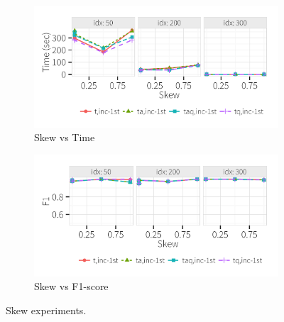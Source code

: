% 
% 
% 
 
  \begin{figure}[h]
    \centering
    \begin{subfigure}[t]{.9\columnwidth}
    \includegraphics[width = \columnwidth]{figures/skew_time}
    \caption{Skew vs Time}
    \label{f:skew_time} 
    \end{subfigure}
    \begin{subfigure}[t]{.9\columnwidth}
    \includegraphics[width = \columnwidth]{figures/skew_acc}
    \caption{Skew vs F1-score}
    \label{f:skew_acc} 
    \end{subfigure}
    \caption{Skew experiments. }
  \end{figure}





